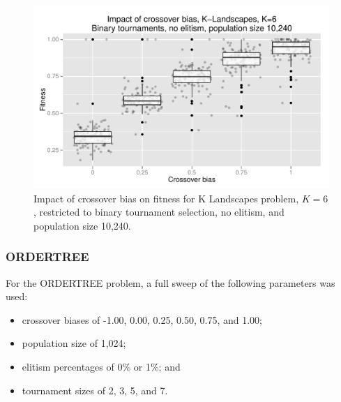 \documentclass{sig-alternate}
\begin{document}
\begin{figure}
\centering
\includegraphics[width=0.45 \textwidth]{Plots/KLandscapes6_XO_bias_strong_impact_alpha_075.pdf}
\caption{Impact of crossover bias on fitness for K Landscapes problem, $K=6$, restricted to binary tournament
selection, no elitism, and population size 10,240.}
\label{fig:KLandscapes6_strong_results}
\end{figure}

%
%
%
%

%
%
%
%

\subsubsection{ORDERTREE}

For the ORDERTREE problem, a full sweep of the following parameters was used:

\begin{itemize}
	\item crossover biases of -1.00, 0.00, 0.25, 0.50, 0.75, and 1.00;
	\item population size of 1,024;
	\item elitism percentages of 0\% or 1\%; and
	\item tournament sizes of 2, 3, 5, and 7.
\end{itemize}
\end{document}
